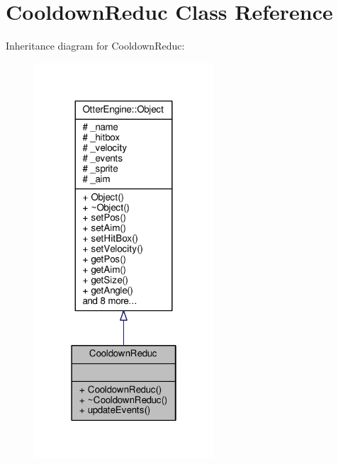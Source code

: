 \hypertarget{class_cooldown_reduc}{}\section{Cooldown\+Reduc Class Reference}
\label{class_cooldown_reduc}


Inheritance diagram for Cooldown\+Reduc\+:\nopagebreak
\begin{figure}[H]
\begin{center}
\leavevmode
\includegraphics[width=190pt]{d3/dc5/class_cooldown_reduc__inherit__graph}
\end{center}
\end{figure}


